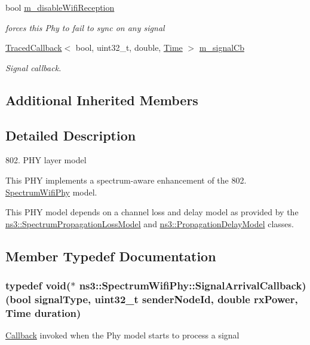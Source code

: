 \begin{DoxyCompactItemize}
bool \hyperlink{classns3_1_1SpectrumWifiPhy_aceccd3aa8c8e75ac9c136b089a10176b}{m\+\_\+disable\+Wifi\+Reception}
\begin{DoxyCompactList}\small\item\em forces this Phy to fail to sync on any signal \end{DoxyCompactList}\item 
\hyperlink{classns3_1_1TracedCallback}{Traced\+Callback}$<$ bool, uint32\+\_\+t, double, \hyperlink{classns3_1_1Time}{Time} $>$ \hyperlink{classns3_1_1SpectrumWifiPhy_a0be57ff837cdbd31902f670ea5bbabe2}{m\+\_\+signal\+Cb}
\begin{DoxyCompactList}\small\item\em Signal callback. \end{DoxyCompactList}\end{DoxyCompactItemize}
\subsection*{Additional Inherited Members}


\subsection{Detailed Description}
802. P\+HY layer model

This P\+HY implements a spectrum-\/aware enhancement of the 802. \hyperlink{classns3_1_1SpectrumWifiPhy}{Spectrum\+Wifi\+Phy} model. 

This P\+HY model depends on a channel loss and delay model as provided by the \hyperlink{classns3_1_1SpectrumPropagationLossModel}{ns3\+::\+Spectrum\+Propagation\+Loss\+Model} and \hyperlink{classns3_1_1PropagationDelayModel}{ns3\+::\+Propagation\+Delay\+Model} classes. 

\subsection{Member Typedef Documentation}
\subsubsection[{\texorpdfstring{Signal\+Arrival\+Callback}{SignalArrivalCallback}}]{\setlength{\rightskip}{0pt plus 5cm}typedef void($\ast$  ns3\+::\+Spectrum\+Wifi\+Phy\+::\+Signal\+Arrival\+Callback) (bool signal\+Type, uint32\+\_\+t sender\+Node\+Id, double rx\+Power, {\bf Time} duration)}\hypertarget{classns3_1_1SpectrumWifiPhy_a72140c8b3f26575356e0293bfc7e09ac}{}\label{classns3_1_1SpectrumWifiPhy_a72140c8b3f26575356e0293bfc7e09ac}
\hyperlink{classns3_1_1Callback}{Callback} invoked when the Phy model starts to process a signal


